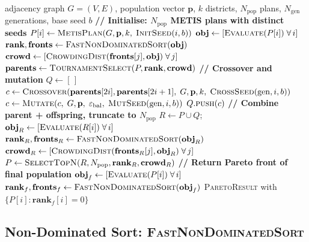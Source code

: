 \begin{algorithm}[t]
\caption{\nsga{}-\textsc{Redistrict}($G$, $\mathbf{p}$, $k$,
  $N_{\mathrm{pop}}$, $N_{\mathrm{gen}}$, $b$)}
\label{alg:nsga2}
\begin{algorithmic}[1]
\Require adjacency graph $G=(V,E)$, population vector $\mathbf{p}$,
  $k$ districts, $N_{\mathrm{pop}}$ plans, $N_{\mathrm{gen}}$ generations,
  base seed $b$
\State \textbf{// Initialise: $N_{\mathrm{pop}}$ METIS plans with distinct seeds}
  \State $P[i] \gets \textsc{MetisPlan}(G, \mathbf{p}, k,\; \textsc{InitSeed}(i, b))$
\EndFor
{}
  \State $\mathbf{obj} \gets [\textsc{Evaluate}(P[i]) \;\forall\, i]$
  \State $\mathbf{rank}, \mathbf{fronts} \gets \textsc{FastNonDominatedSort}(\mathbf{obj})$
  \State $\mathbf{crowd} \gets [\textsc{CrowdingDist}(\mathbf{fronts}[j], \mathbf{obj}) \;\forall\, j]$
  \State $\mathbf{parents} \gets \textsc{TournamentSelect}(P, \mathbf{rank}, \mathbf{crowd})$
  \State \textbf{// Crossover and mutation}
  \State $Q \gets [\,]$
    \State $c \gets \textsc{Crossover}(\mathbf{parents}[2i], \mathbf{parents}[2i+1],\;
                                       G, \mathbf{p}, k,\; \textsc{CrossSeed}(\mathrm{gen}, i, b))$
    \State $c \gets \textsc{Mutate}(c,\; G, \mathbf{p},\; \varepsilon_{\mathrm{bal}},\;
                                    \textsc{MutSeed}(\mathrm{gen}, i, b))$
    \State $Q.\textsc{push}(c)$
  \EndFor
  \State \textbf{// Combine parent + offspring, truncate to $N_{\mathrm{pop}}$}
  \State $R \gets P \cup Q$; \quad $\mathbf{obj}_R \gets [\textsc{Evaluate}(R[i]) \;\forall\, i]$
  \State $\mathbf{rank}_R, \mathbf{fronts}_R \gets \textsc{FastNonDominatedSort}(\mathbf{obj}_R)$
  \State $\mathbf{crowd}_R \gets [\textsc{CrowdingDist}(\mathbf{fronts}_R[j], \mathbf{obj}_R) \;\forall\, j]$
  \State $P \gets \textsc{SelectTopN}(R, N_{\mathrm{pop}}, \mathbf{rank}_R, \mathbf{crowd}_R)$
\EndFor
\State \textbf{// Return Pareto front of final population}
\State $\mathbf{obj}_f \gets [\textsc{Evaluate}(P[i]) \;\forall\, i]$
\State $\mathbf{rank}_f, \mathbf{fronts}_f \gets \textsc{FastNonDominatedSort}(\mathbf{obj}_f)$
\State \Return \textsc{ParetoResult} with $\{P[i] : \mathbf{rank}_f[i] = 0\}$
\end{algorithmic}
\end{algorithm}

\subsection{Non-Dominated Sort: \textsc{FastNonDominatedSort}}

